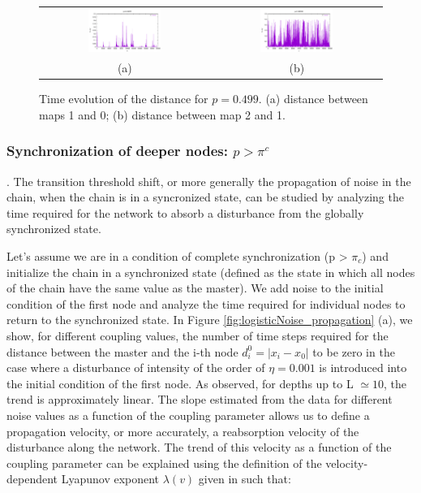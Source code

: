 \documentclass[runningheads]{llncs}
\begin{document}
\begin{figure}
    \centering
    \begin{tabular}{cc}
    \includegraphics[width=0.45\textwidth]{logisticchain-temporal-10-p=0.499000.pdf} & 
     \includegraphics[width=0.45\textwidth]{logisticchain-temporal-21-p=0.499000.pdf}\\
     (a) & (b) \\
    \end{tabular}  
    \caption{Time evolution of the distance for $p=0.499$. (a) distance between maps 1 and 0; (b) distance between map 2 and 1. }
    \label{fig:logistic_distance_evolution}  
\end{figure}

\subsubsection{Synchronization of deeper nodes: $p > \pi^c$}.
The transition threshold shift, or more generally the propagation of noise in the chain, when the chain is in a syncronized state, can be studied by analyzing the time required for the network to absorb a disturbance from the globally synchronized state.

Let's assume we are in a condition of complete synchronization (p > $\pi_c$) and initialize the chain in a synchronized state (defined as the state in which all nodes of the chain have the same value as the master). We add noise to the initial condition of the first node and analyze the time required for individual nodes to return to the synchronized state. In Figure \ref{fig:logisticNoise_propagation} (a), we show, for different coupling values, the number of time steps required for the distance between the master and the i-th node $d^0_i = |x_i - x_0|$ to be zero in the case where a disturbance of intensity of the order of $\eta = 0.001$ is introduced into the initial condition of the first node. As observed, for depths up to L $\simeq 10$, the trend is approximately linear. The slope estimated from the data for different noise values as a function of the coupling parameter allows us to define a propagation velocity, or more accurately, a reabsorption velocity of the disturbance along the network. The trend of this velocity as a function of the coupling parameter can be explained using the definition of the velocity-dependent Lyapunov exponent $\lambda(v)$ given in \cite{Arkady93} such that: 
\end{document}
